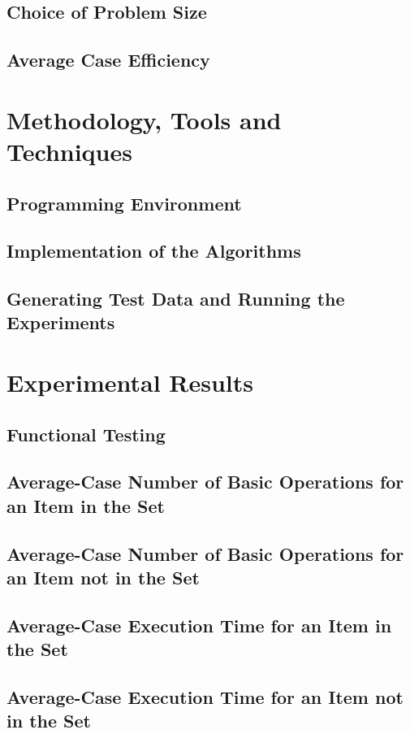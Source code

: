 \documentclass{article}
\begin{document}
    \subsection{Choice of Problem Size}
    \subsection{Average Case Efficiency}

\section{Methodology, Tools and Techniques}
    \subsection{Programming Environment}
    \subsection{Implementation of the Algorithms}
    \subsection{Generating Test Data and Running the Experiments}

\section{Experimental Results}
    \subsection{Functional Testing}
    \subsection{Average-Case Number of Basic Operations for an Item in the Set}
    \subsection{Average-Case Number of Basic Operations for an Item not in the Set}
    \subsection{Average-Case Execution Time for an Item in the Set}
    \subsection{Average-Case Execution Time for an Item not in the Set}
\end{document}
